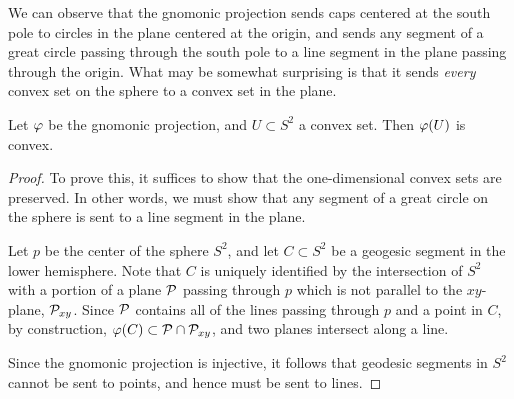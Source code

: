We can observe that the gnomonic projection sends caps centered at the
south pole to circles in the plane centered at the origin, and sends
any segment of a great circle passing through the south pole to a line
segment in the plane passing through the origin.  What may be somewhat
surprising is that it sends \textit{every} convex set on the sphere to
a convex set in the plane.

\begin{lemma} \label{lem:gnomonic_convex}
  Let $\varphi$ be the gnomonic projection, and $U\subset S^2$ a convex 
  set. Then $\varphi(U)$ is convex.
\end{lemma}
\begin{proof}
  To prove this, it suffices to show that the one-dimensional convex
  sets are preserved. In other words, we must show that any segment of 
  a great circle on the sphere is sent to a line segment in the plane.

  Let $p$ be the center of the sphere $S^2$, and let $C\subset S^2$ be
  a geogesic segment in the lower hemisphere.  Note that $C$ is uniquely
  identified by the intersection of $S^2$ with a portion of a plane
  $\mathcal{P}$ passing through $p$ which is not parallel to the $xy$-plane,  $\mathcal{P}_{xy}$. Since $\mathcal{P}$ contains all of the lines passing through $p$ and a point in $C$, by construction, $\varphi(C)\subset \mathcal{P}\cap
  \mathcal{P}_{xy}$, and two planes intersect along a line. 

  Since the gnomonic projection is injective, it follows that 
  geodesic segments in $S^2$ cannot be sent to points, and hence 
  must be sent to lines. 
\end{proof}




